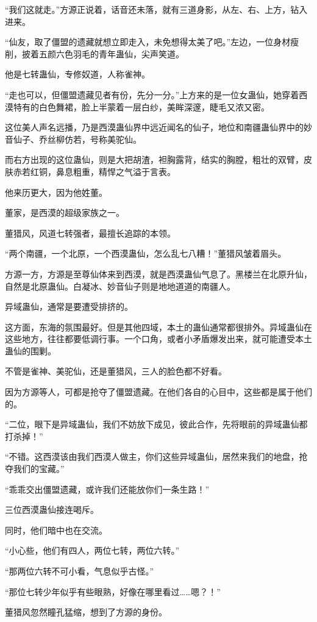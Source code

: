 \begin{this_body}
“我们这就走。”方源正说着，话音还未落，就有三道身影，从左、右、上方，钻入进来。

“仙友，取了僵盟的遗藏就想立即走入，未免想得太美了吧。”左边，一位身材瘦削，披着五颜六色羽毛的青年蛊仙，尖声笑道。

他是七转蛊仙，专修奴道，人称雀神。

“走也可以，但僵盟遗藏见者有份，先分一分。”上方来的是一位女蛊仙，她穿着西漠特有的白色舞裙，脸上半蒙着一层白纱，美眸深邃，睫毛又浓又密。

这位美人声名远播，乃是西漠蛊仙界中远近闻名的仙子，地位和南疆蛊仙界中的妙音仙子、乔丝柳仿若，号称美驼仙。

而右方出现的这位蛊仙，则是大把胡渣，袒胸露背，结实的胸膛，粗壮的双臂，皮肤赤若红铜，鼻息粗重，精悍之气溢于言表。

他来历更大，因为他姓董。

董家，是西漠的超级家族之一。

董猎风，风道七转强者，最擅长追踪的本领。

“两个南疆，一个北原，一个西漠蛊仙，怎么乱七八糟！”董猎风皱着眉头。

方源一方，方源是至尊仙体来到西漠，就是西漠蛊仙气息了。黑楼兰在北原升仙，自然是北原蛊仙。白凝冰、妙音仙子则是地地道道的南疆人。

异域蛊仙，通常是要遭受排挤的。

这方面，东海的氛围最好。但是其他四域，本土的蛊仙通常都很排外。异域蛊仙在这些地方，往往都要低调行事。一个口角，或者小矛盾爆发出来，就可能遭受本土蛊仙的围剿。

不管是雀神、美驼仙，还是董猎风，三人的脸色都不好看。

因为方源等人，可都是抢夺了僵盟遗藏。在他们各自的心目中，这些都是属于他们的。

“二位，眼下是异域蛊仙，我们不妨放下成见，彼此合作，先将眼前的异域蛊仙都打杀掉！”

“不错。这西漠该由我们西漠人做主，你们这些异域蛊仙，居然来我们的地盘，抢夺我们的宝藏。”

“乖乖交出僵盟遗藏，或许我们还能放你们一条生路！”

三位西漠蛊仙接连喝斥。

同时，他们暗中也在交流。

“小心些，他们有四人，两位七转，两位六转。”

“那两位六转不可小看，气息似乎古怪。”

“那位七转少年似乎有些眼熟，好像在哪里看过……嗯？！”

董猎风忽然瞳孔猛缩，想到了方源的身份。


\end{this_body}
